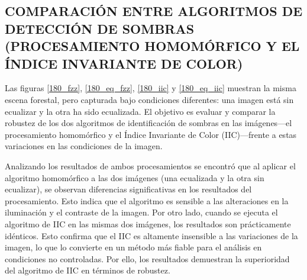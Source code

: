 \color{black}


\subsection{COMPARACIÓN ENTRE ALGORITMOS DE DETECCIÓN DE SOMBRAS (PROCESAMIENTO HOMOMÓRFICO Y EL ÍNDICE INVARIANTE DE COLOR)}

Las figuras \ref{180_fzz}, \ref{180_eq_fzz}, \ref{180_iic} y \ref{180_eq_iic} muestran la misma escena forestal, pero capturada bajo condiciones diferentes: una imagen está sin ecualizar y la otra ha sido ecualizada. El objetivo es evaluar y comparar la robustez de los dos algoritmos de identificación de sombras en las imágenes—el procesamiento homomórfico y el Índice Invariante de Color (IIC)—frente a estas variaciones en las condiciones de la imagen.


Analizando los resultados de ambos procesamientos se encontró que al aplicar el algoritmo homomórfico a las dos imágenes (una ecualizada y la otra sin ecualizar), se observan diferencias significativas en los resultados del procesamiento. Esto indica que el algoritmo es sensible a las alteraciones en la iluminación y el contraste de la imagen. Por otro lado, cuando se ejecuta el algoritmo de IIC en las mismas dos imágenes, los resultados son prácticamente idénticos. Esto confirma que el IIC es altamente insensible a las variaciones de la imagen, lo que lo convierte en un método más fiable para el análisis en condiciones no controladas. Por ello, los resultados demuestran la superioridad del algoritmo de IIC en términos de robustez.